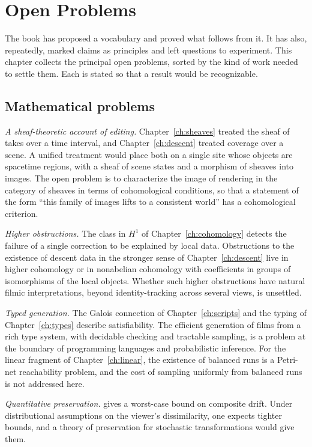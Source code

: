 \chapter{Open Problems}
\label{ch:open}

The book has proposed a vocabulary and proved what follows from it. It has also, repeatedly, marked claims as principles and left questions to experiment. This chapter collects the principal open problems, sorted by the kind of work needed to settle them. Each is stated so that a result would be recognizable.

\section{Mathematical problems}

\emph{A sheaf-theoretic account of editing.} Chapter~\ref{ch:sheaves} treated the sheaf of takes over a time interval, and Chapter~\ref{ch:descent} treated coverage over a scene. A unified treatment would place both on a single site whose objects are spacetime regions, with a sheaf of scene states and a morphism of sheaves into images. The open problem is to characterize the image of rendering in the category of sheaves in terms of cohomological conditions, so that a statement of the form ``this family of images lifts to a consistent world'' has a cohomological criterion.

\emph{Higher obstructions.} The class in $H^1$ of Chapter~\ref{ch:cohomology} detects the failure of a single correction to be explained by local data. Obstructions to the existence of descent data in the stronger sense of Chapter~\ref{ch:descent} live in higher cohomology or in nonabelian cohomology with coefficients in groups of isomorphisms of the local objects. Whether such higher obstructions have natural filmic interpretations, beyond identity-tracking across several views, is unsettled.

\emph{Typed generation.} The Galois connection of Chapter~\ref{ch:scripts} and the typing of Chapter~\ref{ch:types} describe satisfiability. The efficient generation of films from a rich type system, with decidable checking and tractable sampling, is a problem at the boundary of programming languages and probabilistic inference. For the linear fragment of Chapter~\ref{ch:linear}, the existence of balanced runs is a Petri-net reachability problem, and the cost of sampling uniformly from balanced runs is not addressed here.

\emph{Quantitative preservation.}  gives a worst-case bound on composite drift. Under distributional assumptions on the viewer's dissimilarity, one expects tighter bounds, and a theory of preservation for stochastic transformations would give them.

